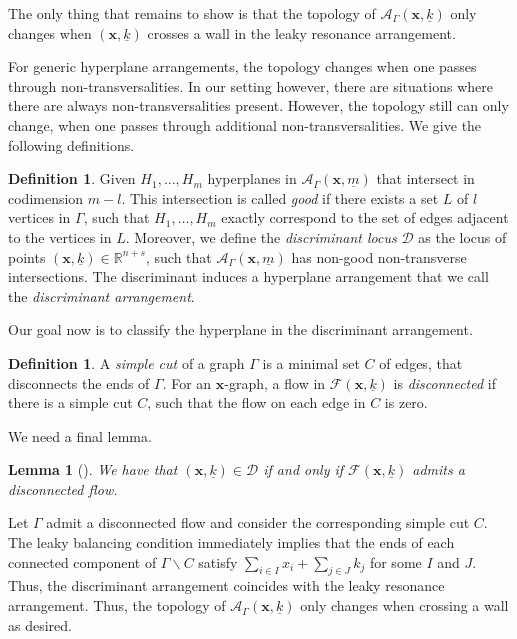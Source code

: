 \documentclass[10pt,a4paper,oneside,no-math,reqno]{amsart}%
\theoremstyle{plain}
\newtheorem{lemma}[theorem]{Lemma}
\theoremstyle{definition}
\newtheorem{definition}[theorem]{Definition}
\theoremstyle{remark}
\numberwithin{equation}{section}
\newcommand{\1}{\mathds{1}}
\newcommand{\<}{\langle}
\renewcommand{\>}{\rangle}
\begin{document}
 
 The only thing that remains to show is that the topology of $\mathcal{A}_\Gamma(\textbf{x},\underline{k})$ only changes when $(\textbf{x},\underline{k})$ crosses a wall in the leaky resonance arrangement.

 For generic hyperplane arrangements, the topology changes when one passes through non-transversalities. In our setting however, there are situations where there are always non-transversalities present. However, the topology still can only change, when one passes through additional non-transversalities. We give the following definitions.

 \begin{definition}
     Given $H_1,\dots,H_m$ hyperplanes in $\mathcal{A}_\Gamma(\textbf{x},\underline{m})$ that intersect in codimension $m-l$. This intersection is called \emph{good} if there exists a set $L$ of $l$ vertices in $\Gamma$, such that $H_1,\dots,H_m$ exactly correspond to the set of edges adjacent to the vertices in $L$. Moreover, we define the \emph{discriminant locus} $\mathcal{D}$ as the locus of points $(\textbf{x},\underline{k})\in\mathbb{R}^{n+s}$, such that $\mathcal{A}_\Gamma(\textbf{x},\underline{m})$ has non-good non-transverse intersections. The discriminant induces a hyperplane arrangement that we call the \emph{discriminant arrangement}.
 \end{definition}

 Our goal now is to classify the hyperplane in the discriminant arrangement.

 \begin{definition}
     A \emph{simple cut} of a graph $\Gamma$ is a minimal set $C$ of edges, that disconnects the ends of $\Gamma$. For an $\textbf{x}$-graph, a flow in $\mathcal{F}(\textbf{x},\underline{k})$ is \emph{disconnected} if there is a simple cut $C$, such that the flow on each edge in $C$ is zero.
 \end{definition}


We need a final lemma.

\begin{lemma}[{\cite[Lemma 3.8]{CJM11}}]
   We have that $(\textbf{x},\underline{k})\in\mathcal{D}$ if and only if $\mathcal{F}(\textbf{x},\underline{k})$ admits a disconnected flow.
\end{lemma}


Let $\Gamma$ admit a disconnected flow and consider the corresponding simple cut $C$. The leaky balancing condition immediately implies that the ends of each connected component of $\Gamma\backslash C$ satisfy $\sum_{i\in I} x_i+\sum_{j\in J}k_j$ for some $I$ and $J$. Thus, the discriminant arrangement coincides with the leaky resonance arrangement. Thus, the topology of $\mathcal{A}_\Gamma(\textbf{x},\underline{k})$ only changes when crossing a wall as desired. 
\end{document}
